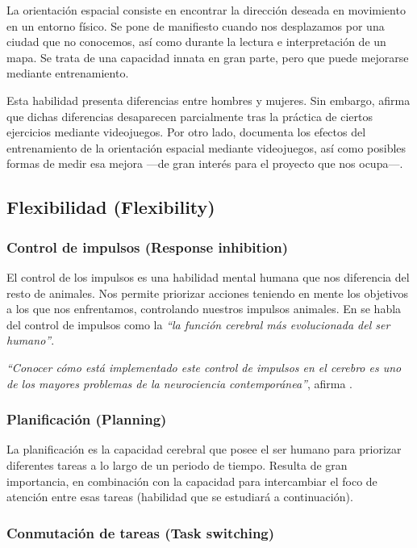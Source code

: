 La orientación espacial consiste en encontrar la dirección deseada en movimiento en un entorno físico. Se pone de manifiesto cuando nos desplazamos por una ciudad que no conocemos, así como durante la lectura e interpretación de un mapa. Se trata de una capacidad innata en gran parte, pero que puede mejorarse mediante entrenamiento.

Esta habilidad presenta diferencias entre hombres y mujeres. Sin embargo, \cite{Jing2007} afirma que dichas diferencias desaparecen parcialmente tras la práctica de ciertos ejercicios mediante videojuegos. Por otro lado, \cite{Lynn1994} documenta los efectos del entrenamiento de la orientación espacial mediante videojuegos, así como posibles formas de medir esa mejora ---de gran interés para el proyecto que nos ocupa---.

\subsection{Flexibilidad (Flexibility)}

\subsubsection{Control de impulsos (Response inhibition)}

El control de los impulsos es una habilidad mental humana que nos diferencia del resto de animales. Nos permite priorizar acciones teniendo en mente los objetivos a los que nos enfrentamos, controlando nuestros impulsos animales. En \cite{Zheng2008} se habla del control de impulsos como la {\it ``la función cerebral más evolucionada del ser humano''}.

{\it ``Conocer cómo está implementado este control de impulsos en el cerebro es uno de los mayores problemas de la neurociencia contemporánea''}, afirma \cite{James2009}.

\subsubsection{Planificación (Planning)}

La planificación es la capacidad cerebral que posee el ser humano para priorizar diferentes tareas a lo largo de un periodo de tiempo. Resulta de gran importancia, en combinación con la capacidad para intercambiar el foco de atención entre esas tareas (habilidad que se estudiará a continuación).

\subsubsection{Conmutación de tareas (Task switching)}

